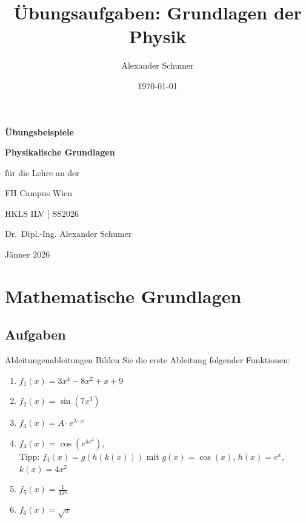 \documentclass[ngerman]{scrreprt}
\title{Übungsaufgaben: Grundlagen der Physik}
\author{Alexander Schumer}
\date{\today}
\begin{document}
    {\Huge \bfseries Übungsbeispiele\par}
    \vspace{0.2cm}

    {\Large \bfseries Physikalische Grundlagen\par} 
    \vspace{1cm}
    {\large für die Lehre an der\par}
    {\Large FH Campus Wien\par}

    {\Large HKLS ILV | SS2026\par}

    \vfill %

    {\large Dr.\ Dipl.-Ing. Alexander Schumer\par}
    \vspace{1cm}

    {\large Jänner 2026\par}

\tableofcontents


\chapter{Mathematische Grundlagen}\label{chap: mathe_grundlagen}

\section{Aufgaben}\label{sec: mathe_grundlagen_aufgaben}


\begin{aufgabebox}{Ableitungen}{ableitungen}
Bilden Sie die erste Ableitung folgender Funktionen:
\begin{enumerate}
    \item $f_{1}(x)=3x^{4}-8x^{2}+x+9$
    \item $f_{2}(x)=\sin(7x^{3})$
    \item $f_{3}(x)=A\cdot e^{\lambda\cdot x}$
    \item $f_{4}(x)=\cos(e^{4x^{2}})$, \\
    Tipp: $f_{4}(x)=g(h(k(x)))$ mit $g(x)=\cos(x)$, $h(x)=e^{x}$, $k(x)=4x^{2}$
    \item $f_{5}(x)=\frac{1}{4x^{5}}$
    \item $f_{6}(x)=\sqrt{x}$
\end{enumerate}
\end{aufgabebox}
\end{document}
